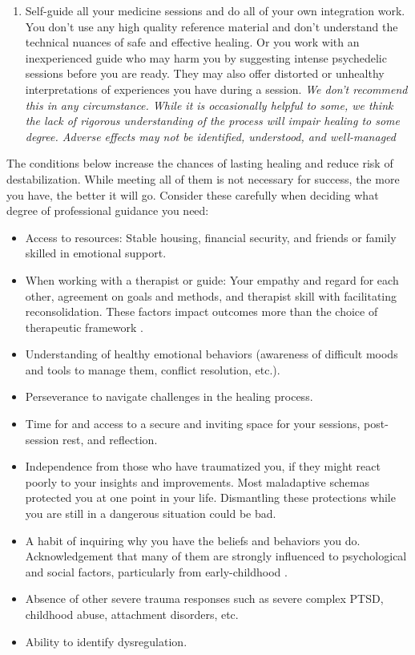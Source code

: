 \documentclass[12pt,letterpaper]{article}
\begin{document}
\begin{enumerate}
    \item Self-guide all your medicine sessions and do all of your own integration work. You don't use any high quality reference material and don't understand the technical nuances of safe and effective healing. Or you work with an inexperienced guide who may harm you by suggesting intense psychedelic sessions before you are ready. They may also offer distorted or unhealthy interpretations of experiences you have during a session. \textit{We don't recommend this in any circumstance. While it is occasionally helpful to some, we think the lack of rigorous understanding of the process will impair healing to some degree. Adverse effects may not be identified, understood, and well-managed} 
\end{enumerate}
The conditions below increase the chances of lasting healing and reduce risk of destabilization. While meeting all of them is not necessary for success, the more you have, the better it will go. Consider these carefully when deciding what degree of professional guidance you need:  
\begin{itemize}
    \item Access to resources: Stable housing, financial security, and friends or family skilled in emotional support.
    \item When working with a therapist or guide: Your empathy and regard for each other, agreement on goals and methods, and therapist skill with facilitating reconsolidation. These factors impact outcomes more than the choice of therapeutic framework \cite{wampoldCommonFactors}.
    \item Understanding of healthy emotional behaviors (awareness of difficult moods and tools to manage them, conflict resolution, etc.). 
    \item Perseverance to navigate challenges in the healing process.
    \item Time for and access to a secure and inviting space for your sessions, post-session rest, and reflection.
    \item Independence from those who have traumatized you, if they might react poorly to your insights and improvements. Most maladaptive schemas protected you at one point in your life. Dismantling these protections while you are still in a dangerous situation could be bad.
    \item A habit of inquiring why you have the beliefs and behaviors you do. Acknowledgement that many of them are strongly influenced to psychological and social factors, particularly from early-childhood \cite{brownAttachmentDisturbances}. 
    \item Absence of other severe trauma responses such as severe complex PTSD, childhood abuse, attachment disorders, etc.
    \item Ability to identify dysregulation.
\end{itemize}
\end{document}
